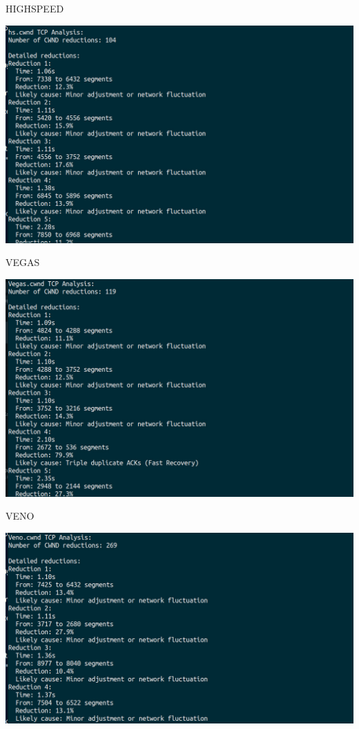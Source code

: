 \documentclass[11pt,a4paper]{article}
\begin{document}
\large{\textcolor{brightcyan}{HIGHSPEED}}

\begin{center}
    \includegraphics[width=1\columnwidth]{images/reduce_cwnd2.jpg}
\end{center}

\large{\textcolor{brightgreen}{VEGAS}}

\begin{center}
    \includegraphics[width=1\columnwidth]{images/reduce_cwnd3.jpg}
\end{center}

\large{\textcolor{brightpurple}{VENO}}
\normalsize
\begin{center}
    \includegraphics[width=1\columnwidth]{images/reduce_cwnd4.jpg}
\end{center}
\end{document}
